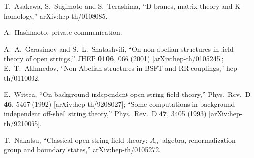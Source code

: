 \documentclass[a4paper,12pt]{article}
\begin{document}
\begin{thebibliography}{999}
T.~Asakawa, S.~Sugimoto and S.~Terashima,
``D-branes, matrix theory and K-homology,''
arXiv:hep-th/0108085.

A.~Hashimoto, private communication.


A.~A.~Gerasimov and S.~L.~Shatashvili,
``On non-abelian structures in field theory of open strings,''
JHEP {\bf 0106}, 066 (2001)
[arXiv:hep-th/0105245];
E.~T.~Akhmedov,
``Non-Abelian structures in BSFT and RR couplings,''
hep-th/0110002.

E.~Witten,
``On background independent 
open string field theory,''
Phys.\ Rev.\ D {\bf 46}, 5467 (1992)
[arXiv:hep-th/9208027];
``Some computations in background 
independent off-shell string theory,''
Phys.\ Rev.\ D {\bf 47}, 3405 (1993)
[arXiv:hep-th/9210065].

T.~Nakatsu,
``Classical open-string field theory: $A_\infty$-algebra,  
renormalization group and boundary states,''
arXiv:hep-th/0105272.


\end{thebibliography}
\end{document}
